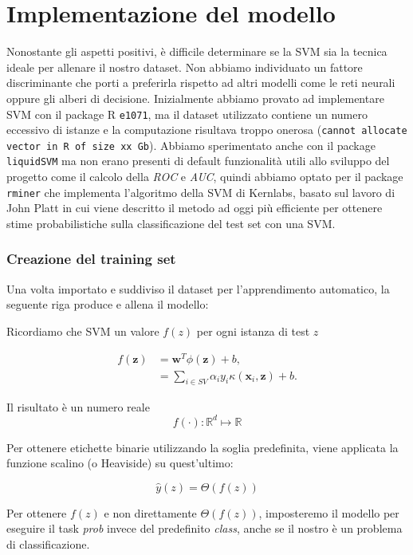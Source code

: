 \section{Implementazione del modello}

Nonostante gli aspetti positivi, è difficile determinare se la SVM sia la tecnica ideale per allenare il nostro dataset. Non abbiamo individuato un fattore discriminante che porti a preferirla rispetto ad altri modelli come le reti neurali oppure gli alberi di decisione.
Inizialmente abbiamo provato ad implementare SVM con il package R \texttt{e1071}, ma il dataset utilizzato contiene un numero eccessivo di istanze e la computazione risultava troppo onerosa (\texttt{cannot allocate vector in R of size xx Gb}). Abbiamo sperimentato anche con il package \texttt{liquidSVM} ma non erano presenti di default funzionalità utili allo sviluppo del progetto come il calcolo della \textit{ROC} e \textit{AUC}, quindi abbiamo optato per il package \texttt{rminer} che implementa l’algoritmo della SVM di Kernlabs, basato sul lavoro di John Platt \cite{Platt99probabilisticoutputs} in cui viene descritto il metodo ad oggi più efficiente per ottenere stime probabilistiche sulla classificazione del test set con una SVM.

\subsubsection{Creazione del training set}

Una volta importato e suddiviso il dataset per l’apprendimento automatico, la seguente riga produce e allena il modello:

\texttt{}


Ricordiamo che SVM un valore $ f(z) $ per ogni istanza di test $z$

\begin{align}
f(\mathbf{z}) &= \mathbf{w}^T\phi(\mathbf{z}) + b, \\
&= \sum_{i\in SV} \alpha_i y_i \kappa(\mathbf{x}_i,\mathbf{z}) + b.
\end{align}

Il risultato è un numero reale 
$$f(\cdot):\mathbb{R}^d \mapsto \mathbb{R}$$

Per ottenere etichette binarie utilizzando la soglia predefinita, viene applicata la funzione scalino (o Heaviside) su quest'ultimo:

$$\hat{y}(z) = \Theta(f(z))$$

Per ottenere $f(z)$ e non direttamente $\Theta(f(z))$, imposteremo il modello per eseguire il task \textit{prob} invece del predefinito \textit{class}, anche se il nostro è un problema di classificazione.

